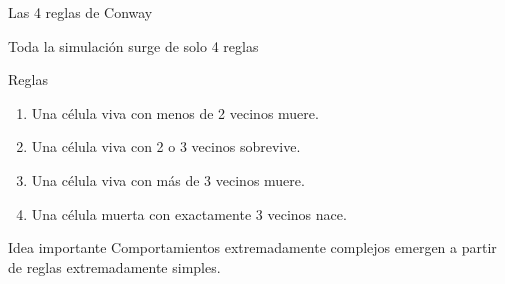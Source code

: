 \documentclass[10pt,aspectratio=169]{beamer}
\begin{document}
\begin{frame}{Las 4 reglas de Conway}

\begin{center}
\Large Toda la simulación surge de solo 4 reglas
\end{center}

\vspace{0.4cm}

\begin{block}{Reglas}
\begin{enumerate}
    \item Una célula viva con menos de 2 vecinos muere.
    \item Una célula viva con 2 o 3 vecinos sobrevive.
    \item Una célula viva con más de 3 vecinos muere.
    \item Una célula muerta con exactamente 3 vecinos nace.
\end{enumerate}
\end{block}

\vspace{0.4cm}

\begin{alertblock}{Idea importante}
Comportamientos extremadamente complejos emergen
a partir de reglas extremadamente simples.
\end{alertblock}

\end{frame}
\end{document}
